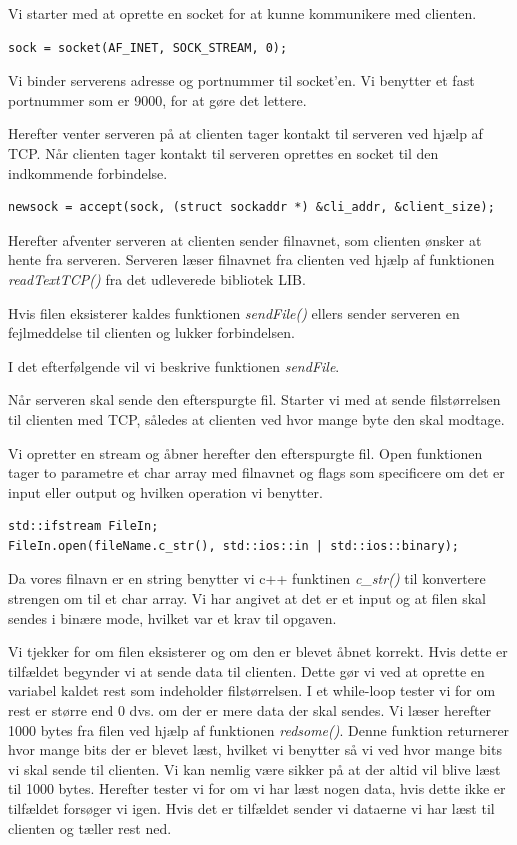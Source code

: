Vi starter med at oprette en socket for at kunne kommunikere med clienten. \\

\begin{lstlisting}
sock = socket(AF_INET, SOCK_STREAM, 0);
\end{lstlisting}

Vi binder serverens adresse og portnummer til socket'en. Vi benytter et fast portnummer som er 9000, for at gøre det lettere. 

Herefter venter serveren på at clienten tager kontakt til serveren ved hjælp af TCP. Når clienten tager kontakt til serveren oprettes en socket til den indkommende forbindelse. 

\begin{lstlisting}
newsock = accept(sock, (struct sockaddr *) &cli_addr, &client_size);
\end{lstlisting}

Herefter afventer serveren at clienten sender filnavnet, som clienten ønsker at hente fra serveren. Serveren læser filnavnet fra clienten ved hjælp af funktionen \textit{readTextTCP()} fra det udleverede bibliotek LIB. 

Hvis filen eksisterer kaldes funktionen \textit{sendFile()} ellers sender serveren en fejlmeddelse til clienten og lukker forbindelsen. 

I det efterfølgende vil vi beskrive funktionen \textit{sendFile}. 

Når serveren skal sende den efterspurgte fil. Starter vi med at sende filstørrelsen til clienten med TCP, således at clienten ved hvor mange byte den skal modtage. 

Vi opretter en stream og åbner herefter den efterspurgte fil. Open funktionen tager to parametre et char array med filnavnet og flags som specificere om det er input eller output og hvilken operation vi benytter. 

\begin{lstlisting}
std::ifstream FileIn; 
FileIn.open(fileName.c_str(), std::ios::in | std::ios::binary);
\end{lstlisting}

Da vores filnavn er en string benytter vi c++ funktinen \textit{c\_str()} til konvertere strengen om til et char array. Vi har angivet at det er et input og at filen skal sendes i binære mode, hvilket var et krav til opgaven. 

Vi tjekker for om filen eksisterer og om den er blevet åbnet korrekt.
Hvis dette er tilfældet begynder vi at sende data til clienten. Dette gør vi ved at oprette en variabel kaldet rest som indeholder filstørrelsen. 
I et while-loop tester vi for om rest er større end 0 dvs. om der er mere data der skal sendes. 
Vi læser herefter 1000 bytes fra filen ved hjælp af funktionen \textit{redsome()}. Denne funktion returnerer hvor mange bits der er blevet læst, hvilket vi benytter så vi ved hvor mange bits vi skal sende til clienten. Vi kan nemlig være sikker på at der altid vil blive læst til 1000 bytes. 
Herefter tester vi for om vi har læst nogen data, hvis dette ikke er tilfældet forsøger vi igen. Hvis det er tilfældet sender vi dataerne vi har læst til clienten og tæller rest ned. 

